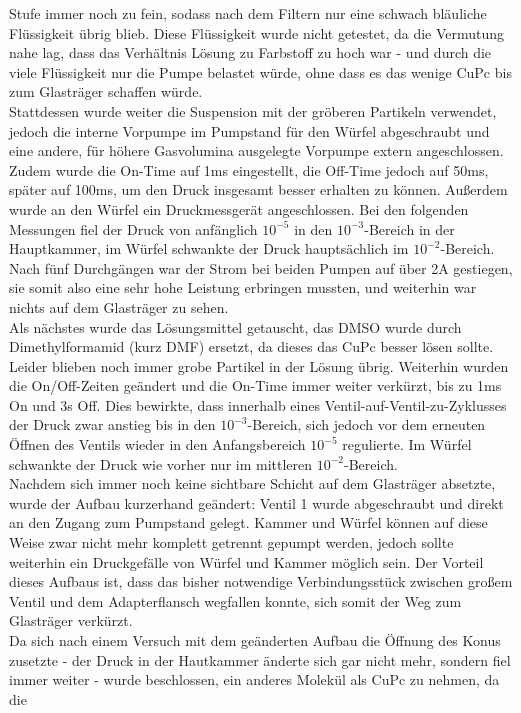 Stufe immer noch zu fein, sodass nach dem Filtern nur eine schwach bläuliche Flüssigkeit übrig blieb. Diese
Flüssigkeit wurde nicht getestet, da die Vermutung nahe lag, dass das Verhältnis Lösung zu Farbstoff zu hoch
war - und durch die viele Flüssigkeit nur die Pumpe belastet würde, ohne dass es das wenige CuPc bis zum
Glasträger schaffen würde.\\
Stattdessen wurde weiter die Suspension mit der gröberen Partikeln verwendet, jedoch die interne Vorpumpe im
Pumpstand für den Würfel abgeschraubt und eine andere, für höhere Gasvolumina ausgelegte Vorpumpe extern
angeschlossen. Zudem wurde die On-Time auf 1ms eingestellt, die Off-Time jedoch auf 50ms, später auf 100ms, um
den Druck insgesamt besser erhalten zu können. Außerdem wurde an den Würfel ein Druckmessgerät angeschlossen.
Bei den folgenden Messungen fiel der Druck von anfänglich $10^{-5}$ in den $10^{-3}$-Bereich in der
Hauptkammer, im Würfel schwankte der Druck hauptsächlich im $10^{-2}$-Bereich. Nach fünf Durchgängen war der
Strom bei beiden Pumpen auf über 2A gestiegen, sie somit also eine sehr hohe Leistung erbringen mussten, und
weiterhin war nichts auf dem Glasträger zu sehen.\\
Als nächstes wurde das Lösungsmittel getauscht, das DMSO wurde durch Dimethylformamid (kurz DMF) ersetzt,
da dieses das CuPc besser lösen sollte. Leider blieben noch immer grobe Partikel in der Lösung übrig. Weiterhin
wurden die On/Off-Zeiten geändert und die On-Time immer weiter verkürzt, bis zu 1ms On und 3s Off. Dies
bewirkte, dass innerhalb eines Ventil-auf-Ventil-zu-Zyklusses der Druck zwar anstieg bis in den
$10^{-3}$-Bereich, sich jedoch vor dem erneuten Öffnen des Ventils wieder in den Anfangsbereich $10^{-5}$
regulierte. Im Würfel schwankte der Druck wie vorher nur im mittleren $10^{-2}$-Bereich.\\
Nachdem sich immer noch keine sichtbare Schicht auf dem Glasträger absetzte, wurde der Aufbau kurzerhand
geändert: Ventil 1 wurde abgeschraubt und direkt
an den Zugang zum Pumpstand gelegt.
Kammer und Würfel können auf diese Weise zwar nicht mehr komplett getrennt gepumpt werden, jedoch sollte
weiterhin ein Druckgefälle von Würfel und Kammer möglich sein. Der Vorteil dieses Aufbaus ist, dass das bisher
notwendige Verbindungsstück zwischen großem Ventil und dem Adapterflansch wegfallen konnte, sich somit der Weg
zum Glasträger verkürzt. \\
 Da sich nach einem Versuch mit dem geänderten Aufbau die Öffnung des Konus zusetzte - der Druck in der
 Hautkammer änderte sich gar nicht mehr, sondern fiel immer weiter - wurde beschlossen, ein anderes Molekül als CuPc zu nehmen, da die

